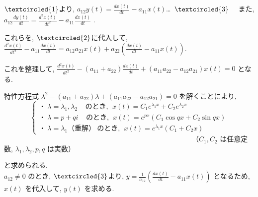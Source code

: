 \documentclass[11pt]{jsarticle}
\begin{document}
$\textcircled{\scriptsize1}$より, $\displaystyle a_{12}y(t) = \frac{dx(t)}{dt} - a_{11}x(t)$…\ $\textcircled{\scriptsize3}$ \ \ また, $\displaystyle a_{12}\frac{dy(t)}{dt} = \frac{d^{2}x(t)}{dt^{2}} - a_{11}\frac{dx(t)}{dt}$ . \par
これらを, $\textcircled{\scriptsize2}$に代入して, $\displaystyle \frac{d^{2}x(t)}{dt^{2}} - a
_{11}\frac{dx(t)}{dt} = a_{12}a_{21}x(t) + a_{22}(\frac{dx(t)}{dt} - a_{11}x(t))$. \par
これを整理して, $\displaystyle \frac{d^{2}x(t)}{dt^{2}} - (a_{11} + a_{22})\frac{dx(t)}{dt} + (a_{11}a_{22} - a_{12}a_{21})x(t) = 0$ となる. \par
特性方程式 $\lambda^{2} - (a_{11} + a_{22})\lambda + (a_{11}a_{22} - a_{12}a_{21}) = 0$ を解くことにより, 
\[\left\{ 
\begin{array}{l}
・\ \lambda = \lambda_{1}, \lambda_{2} \ \ \ \ \ のとき, \ \ x(t) = C_{1}e^{\lambda_{1}x}+C_{2}e^{\lambda_{2}x}\\
・\ \lambda = p + qi \ \ \ \ \ のとき, \ \ x(t) = e^{px}(C_{1}\cos qx + C_{2}\sin qx)\\
・\ \lambda = \lambda_{1} （重解） \ のとき, \ \ x(t) = e^{\lambda_{1}x}(C_{1} + C_{2}x)
\end{array}
\right.\]
\ \ \ \ \ \ \ \ \ \ \ \ \ \ \  \ \ \ \ \ \ \ \ \ \ \ \  \ \ \ \ \ \ \ \ \ \ \ \ \ \ \ \ \ \ \ \ \ \ \ \ \ \ \ （$C_{1}, C_{2}$ は任意定数, $\lambda_{1}, \lambda_{2}, p, q$ は実数）\par
と求められる. \\
$a_{12} \neq 0$ のとき, $\textcircled{\scriptsize3}$より, $y = \frac{1}{a_{12}}(\frac{dx(t)}{dt}-a_{11}x(t))$ となるため, $x(t)$ を代入して, $y(t)$ を求める. 
\end{document}
